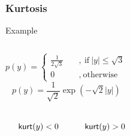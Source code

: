 \begin{frame}
  \frametitle{Kurtosis \cont}
  
  \begin{ovalblock}{Example}
    \begin{columns}
        {\footnotesize
        \begin{displaymath}
          p(y) = \begin{cases}
                   \frac{1}{2\sqrt{3}} \quad &, ~\mbox{if}~|y| \leq \sqrt{3} \\
                   0 \quad &, ~\mbox{otherwise}
                 \end{cases}
        \end{displaymath}
        }
        {\footnotesize
        \begin{displaymath}
          p(y) = \frac{1}{\sqrt{2}} \exp(-\sqrt{2} |y|)
        \end{displaymath}
        }
    \end{columns}

    \vspace{-0.5cm}
    \begin{columns}
        \begin{center}
          \resizebox{.85\linewidth}{!}{
            
          }
        \end{center}
%
        \vspace{-0.3cm}
        {\footnotesize
        \begin{displaymath}
          \mathop{\mathsf{kurt}}(y) < 0
        \end{displaymath}
        }

        \begin{center}
          \resizebox{.85\linewidth}{!}{
            
          }
        \end{center}
        \vspace{-0.3cm}
        {\footnotesize
        \begin{displaymath}
          \mathop{\mathsf{kurt}}(y) > 0
        \end{displaymath}
        }
    \end{columns}
  \end{ovalblock}
\end{frame}


